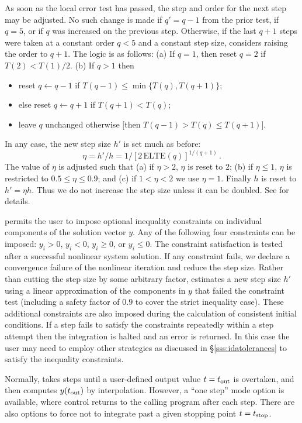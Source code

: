 As soon as the local error test has passed, the step and order for the
next step may be adjusted.  No such change is made if $q' = q-1$ from
the prior test, if $q = 5$, or if $q$ was increased on the previous
step.  Otherwise, if the last $q+1$ steps were taken at a constant
order $q < 5$ and a constant step size, {\idas} considers raising the order
to $q+1$.  The logic is as follows: (a) If $q = 1$, then reset $q = 2$
if $T(2) < T(1)/2$.  (b) If $q > 1$ then
\begin{itemize}
\item reset $q \leftarrow q-1$ if $T(q-1) \leq \min\{T(q),T(q+1)\}$;
\item else reset $q \leftarrow q+1$ if $T(q+1) < T(q)$;
\item leave $q$ unchanged otherwise $[$then $T(q-1) > T(q) \leq T(q+1)]$.
\end{itemize}
In any case, the new step size $h'$ is set much as before:
\[ \eta = h'/h = 1/[2 \, \mbox{ELTE}(q)]^{1/(q+1)} \, . \]
The value of $\eta$ is adjusted such that (a) if $\eta > 2$, $\eta$ is
reset to 2; (b) if $\eta \leq 1$, $\eta$ is restricted to
$0.5 \leq \eta \leq 0.9$; and (c) if $1 < \eta < 2$ we use $\eta = 1$.
Finally $h$ is reset to $h' = \eta h$.  Thus we do not increase the
step size unless it can be doubled.  See \cite{BCP:96} for details.

{\idas} permits the user to impose optional inequality constraints on individual
components of the solution vector $y$. Any of the following four constraints
can be imposed: $y_i > 0$, $y_i < 0$, $y_i \geq 0$, or $y_i \leq 0$.
The constraint satisfaction is tested after a successful nonlinear system solution.
If any constraint fails, we declare a convergence failure of the nonlinear iteration
and reduce the step size. Rather than cutting the step size by some arbitrary factor,
{\idas} estimates a new step size $h'$ using a linear approximation of the components
in $y$ that failed the constraint test (including a safety factor of $0.9$ to
cover the strict inequality case). These additional constraints are also imposed
during the calculation of consistent initial conditions.
If a step fails to satisfy the constraints repeatedly within a step attempt
then the integration is halted and an error is returned. In this case the user
may need to employ other strategies as discussed in \S\ref{sss:idatolerances} to
satisfy the inequality constraints.

Normally, {\idas} takes steps until a user-defined output value $t =
t_{\mbox{\scriptsize out}}$ is overtaken, and then computes
$y(t_{\mbox{\scriptsize out}})$ by interpolation.  However, a
``one step'' mode option is available, where control returns to the
calling program after each step.  There are also options to force {\idas}
not to integrate past a given stopping point $t = t_{\mbox{\scriptsize
stop}}$.


